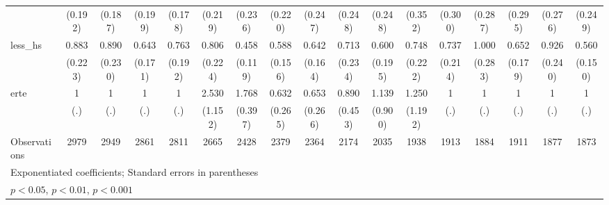 {\begin{tabular}{l*{16}{c}}
                    &     (0.192)         &     (0.187)         &     (0.199)         &     (0.178)         &     (0.219)         &     (0.236)         &     (0.220)         &     (0.247)         &     (0.248)         &     (0.248)         &     (0.352)         &     (0.300)         &     (0.287)         &     (0.295)         &     (0.276)         &     (0.249)         \\
[1em]
less\_hs             &       0.883         &       0.890         &       0.643         &       0.763         &       0.806         &       0.458\sym{**} &       0.588\sym{*}  &       0.642         &       0.713         &       0.600         &       0.748         &       0.737         &       1.000         &       0.652         &       0.926         &       0.560\sym{*}  \\
                    &     (0.223)         &     (0.230)         &     (0.171)         &     (0.192)         &     (0.224)         &     (0.119)         &     (0.156)         &     (0.164)         &     (0.234)         &     (0.195)         &     (0.222)         &     (0.214)         &     (0.283)         &     (0.179)         &     (0.240)         &     (0.150)         \\
[1em]
erte                &           1         &           1         &           1         &           1         &       2.530\sym{*}  &       1.768\sym{*}  &       0.632         &       0.653         &       0.890         &       1.139         &       1.250         &           1         &           1         &           1         &           1         &           1         \\
                    &         (.)         &         (.)         &         (.)         &         (.)         &     (1.152)         &     (0.397)         &     (0.265)         &     (0.266)         &     (0.453)         &     (0.900)         &     (1.192)         &         (.)         &         (.)         &         (.)         &         (.)         &         (.)         \\
\hline
Observations        &        2979         &        2949         &        2861         &        2811         &        2665         &        2428         &        2379         &        2364         &        2174         &        2035         &        1938         &        1913         &        1884         &        1911         &        1877         &        1873         \\
\hline\hline
\multicolumn{17}{l}{\footnotesize Exponentiated coefficients; Standard errors in parentheses}\\
\multicolumn{17}{l}{\footnotesize \sym{*} \(p<0.05\), \sym{**} \(p<0.01\), \sym{***} \(p<0.001\)}\\
\end{tabular}
}
